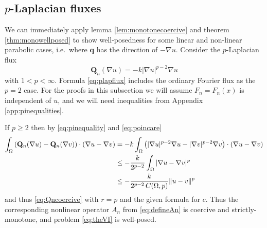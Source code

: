 \documentclass[final,leqno,onefignum,onetabnum]{siamltex1213bueler}
\newcommand\bq{\mathbf{q}}
\newcommand\bQ{\mathbf{Q}}
\renewcommand{\grad}{\nabla}
\begin{document}
\subsection{$p$-Laplacian fluxes} \label{subsec:plap}  We can immediately apply lemma \ref{lem:monotonecoercive} and theorem \ref{thm:monowellposed} to show well-posedness for some linear and non-linear parabolic cases, i.e.~where $\bq$ has the direction of $-\grad u$.  Consider the $p$-Laplacian \cite{Evans1998} flux
\begin{equation}
  \bQ_n(\grad u) = - k |\grad u|^{p-2} \grad u \label{eq:plapflux}
\end{equation}
with $1<p<\infty$.  Formula \eqref{eq:plapflux} includes the ordinary Fourier flux as the $p=2$ case.  For the proofs in this subsection we will assume $F_n=F_n(x)$ is independent of $u$, and we will need inequalities from Appendix \ref{app:pinequalities}.

If $p\ge 2$ then by \eqref{eq:pinequality} and \eqref{eq:poincare}
\begin{align}
\int_\Omega \left(\bQ_n(\grad u) - \bQ_n(\grad v)\right)\cdot (\grad u - \grad v) &= -k  \int_\Omega \left(|\grad u|^{p-2} \grad u - |\grad v|^{p-2} \grad v\right)\cdot (\grad u - \grad v) \notag \\
  &\le - \frac{k}{2^{p-2}} \int_\Omega |\grad u - \grad v|^p \notag \\
  &\le - \frac{k}{2^{p-2}\,C(\Omega,p)} \|u-v\|^p \label{eq:plapQnmono}
\end{align}
and thus \eqref{eq:Qncoercive} with $r=p$ and the given formula for $c$.  Thus the corresponding nonlinear operator $A_n$ from \eqref{eq:defineAn} is coercive and strictly-monotone, and problem \eqref{eq:theVI} is well-posed.
\end{document}
